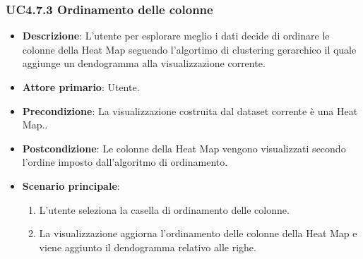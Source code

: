 \subsubsection{UC4.7.3 Ordinamento delle colonne}
\label{ssub:uc4.7.3}
\begin{itemize}
    \item \textbf{Descrizione}: L’utente per esplorare meglio i dati decide di ordinare le colonne della Heat Map
                                seguendo l'algortimo di clustering gerarchico il quale aggiunge un dendogramma alla visualizzazione corrente.
	
    \item \textbf{Attore primario}: Utente.
    
    \item \textbf{Precondizione}:   La visualizzazione costruita dal dataset corrente è una Heat Map..
    \item \textbf{Postcondizione}:  Le colonne della Heat Map vengono visualizzati secondo l'ordine imposto dall'algoritmo di ordinamento.

	\item \textbf{Scenario principale}:
        \begin{enumerate}
            \item   L'utente seleziona la casella di ordinamento delle colonne.
            \item   La visualizzazione aggiorna l'ordinamento delle colonne della Heat Map 
                    e viene aggiunto il dendogramma relativo alle righe.
        \end{enumerate}
\end{itemize}



